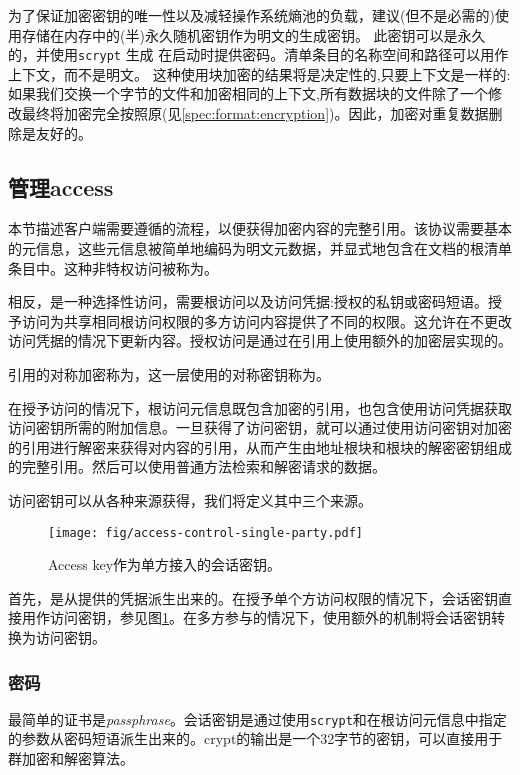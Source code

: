 为了保证加密密钥的唯一性以及减轻操作系统熵池的负载，建议(但不是必需的)使用存储在内存中的(半)永久随机密钥作为明文的生成密钥。
此密钥可以是永久的，并使用\lstinline{scrypt} \cite{percival2009stronger}生成
在启动时提供密码。清单条目的名称空间和路径可以用作上下文，而不是明文。
这种使用块加密的结果将是决定性的,只要上下文是一样的:如果我们交换一个字节的文件和加密相同的上下文,所有数据块的文件除了一个修改最终将加密完全按照原(见\ref{spec:format:encryption})。因此，加密对重复数据删除是友好的。 


\subsection{管理access\statusgreen}\label{sec:managing-access}

本节描述客户端需要遵循的流程，以便获得加密内容的完整引用。该协议需要基本的元信息，这些元信息被简单地编码为明文元数据，并显式地包含在文档的根清单条目中。这种非特权访问被称为。

相反，是一种选择性访问，需要根访问以及访问凭据:授权的私钥或密码短语。授予访问为共享相同根访问权限的多方访问内容提供了不同的权限。这允许在不更改访问凭据的情况下更新内容。授权访问是通过在引用上使用额外的加密层实现的。

引用的对称加密称为，这一层使用的对称密钥称为。

在授予访问的情况下，根访问元信息既包含加密的引用，也包含使用访问凭据获取访问密钥所需的附加信息。一旦获得了访问密钥，就可以通过使用访问密钥对加密的引用进行解密来获得对内容的引用，从而产生由地址根块和根块的解密密钥组成的完整引用。然后可以使用普通方法检索和解密请求的数据。

访问密钥可以从各种来源获得，我们将定义其中三个来源。

\begin{figure}[htbp]
\centering
\texttt{[image: fig/access-control-single-party.pdf]}
\caption[Access key作为单方访问的会话密钥\statusyellow]{Access key作为单方接入的会话密钥。}
\label{fig:access-control-single-party}
\end{figure}

首先，是从提供的凭据派生出来的。在授予单个方访问权限的情况下，会话密钥直接用作访问密钥，参见图\ref{fig:access-control-single-party}。在多方参与的情况下，使用额外的机制将会话密钥转换为访问密钥。

\subsubsection{密码}
最简单的证书是\emph{passphrase}。会话密钥是通过使用\lstinline{scrypt}和在根访问元信息中指定的参数从密码短语派生出来的。crypt的输出是一个32字节的密钥，可以直接用于群加密和解密算法。

